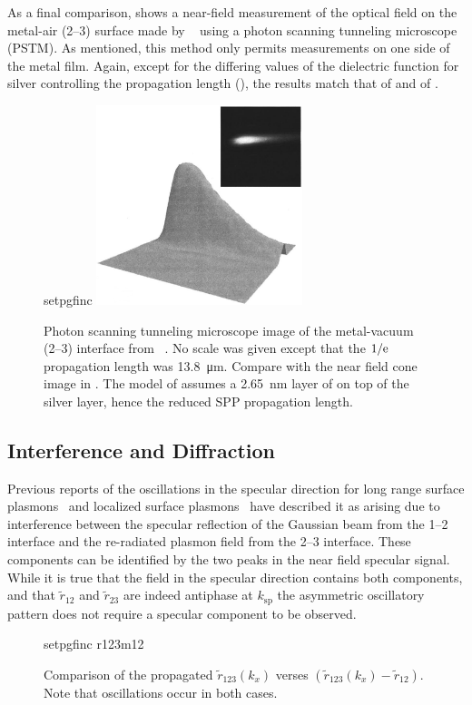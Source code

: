 As a final comparison,  shows a near-field
measurement of the optical field on the metal-air (2--3) surface made by
~\cite{dawson2001surface} using a photon scanning tunneling
microscope (PSTM).  As mentioned, this method only permits measurements on one
side of the metal film.  Again, except for the differing values of the
dielectric function for silver controlling the propagation length
(), the results match that of  and of
.
\begin{figure}[ht]
\centering
{setpgfinc}
\includegraphics[keepaspectratio,width=6cm]{interference/figures/DawsonTransmitted.png}
\caption{Photon scanning tunneling microscope image of the metal-vacuum (2--3)
				interface from ~\cite{dawson2001surface}.  No scale was
				given except that the $1/{\mathrm{e}}$ propagation length was
				\SI{13.8}{\micro\meter}.  Compare with
				the near field cone image in .  The model of
				 assumes a \SI{2.65}{\nano\meter} layer of  on
				top of the silver layer, hence the reduced SPP propagation length.}
\label{fig:dawsoncompare}
\end{figure}


\subsection{Interference and Diffraction}
Previous reports of the oscillations in the specular direction for long
range surface plasmons~\cite{simon2007observation} and localized surface
plasmons~\cite{schumann2008near} have described it as arising due to
interference between the specular reflection of the Gaussian beam from the
1--2 interface and the re-radiated plasmon field from the 2--3 interface.
These components can be identified by the two peaks in the near field
specular signal.  While it is true that the field in the
specular direction contains both components, and that $\tilde{r}_{12}$ and
$\tilde{r}_{23}$ are indeed antiphase at $k_\text{sp}$ the asymmetric 
oscillatory pattern does not require a specular component to be observed.
\begin{figure}[ht]
 \centering
 {setpgfinc}
 {r123m12}
\caption{Comparison of the propagated $\tilde{r}_{123}(k_x)$ verses
$(\tilde{r}_{123}(k_x)-\tilde{r}_{12})$.  Note that oscillations occur in
both cases.  }
\label{fig:r123m12}
\end{figure}

